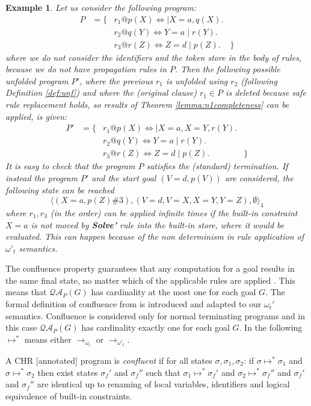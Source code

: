\documentclass[final]{acmtrans2e}
\newtheorem{exa}[theorem]{Example}
\newenvironment{example}{\begin{exa}}{\end{exa}}
\newcommand{\la}{\langle}
\newcommand{\ra}{\rangle}
\newcommand{\rrarrow}{\longrightarrow}
\begin{document}
\begin{example}
Let us consider the following program:
\[
\begin{array}{lcll}
P&=\{&r_1@p(X)\Leftrightarrow \mid X=a, q(X).&\\
&&r_2@q(Y)\Leftrightarrow Y=a \mid r(Y).&\\
&&r_3@r(Z)\Leftrightarrow Z=d \mid p(Z).&\}
\end{array}
\]
where we do not consider the identifiers and the token store in the
body of rules, because we do not have propagation rules in $P$.
Then the following possible unfolded program $P'$, where the previous
$r_1$ is unfolded using $r_2$ (following Definition \ref{def:unf}) and where the
(original clause) $r_1 \in P$ is deleted because safe rule replacement holds, so results of Theorem
\ref{lemma:n1completeness} can be applied, is given:
\[
\begin{array}{lcll}
P'&=\{&r_1@p(X)\Leftrightarrow \mid X=a, X=Y, r(Y).&\\
&&r_2@q(Y)\Leftrightarrow Y=a \mid r(Y).&\\
&&r_3@r(Z)\Leftrightarrow Z=d \mid p(Z).&\}
\end{array}
\]
It is easy to check that the program $P$ satisfies the (standard) termination.
If instead the program $P'$ and the start goal $(V=d,p(V))$ are
considered, the following state can be reached
$$\la  (X=a, p(Z)\#3),(V=d, V=X, X= Y, Y=Z), \emptyset \ra_4$$
where $r_1,r_3$ (in the order) can be applied infinite times if the built-in constraint $X=a$
is not moved by \textbf{Solve'} rule into the built-in store, where it would be
evaluated. This can happen because of the non determinism in rule application of
$\omega'_t$ semantics.
\end{example}

The confluence property guarantees that any computation for a goal
results in the same final state, no matter which of the applicable
rules are applied \cite{AF04}. This means that $\mathcal{QA}_P(G)$ has
cardinality  at the most one for each goal $G$.
The formal definition of confluence from \cite{Fru04}
is introduced and adapted to our $\omega_t'$ semantics.
Confluence is considered only for normal terminating programs and in this case $\mathcal{QA}_P(G)$ has
cardinality exactly one for each goal $G$.
In the following $\mapsto^{*}$ means either $\rrarrow_{\omega_t} $ or $\rrarrow_{\omega'_t}$.


\begin{definition}[Confluence]
A CHR [annotated] program is \emph{confluent} if for all states
$\sigma, \sigma_1, \sigma_2$:
if $\sigma\mapsto^{*} \sigma_1$ and $\sigma\mapsto^{*} \sigma_2$ then exist states $\sigma_f'$
and $\sigma_f''$ such that $\sigma_1 \mapsto^{*}\sigma_f'$ and $\sigma_2\mapsto^{*}\sigma_f''$ and
$\sigma_f'$ and $\sigma_f''$ are identical up to renaming of local variables,
identifiers and logical equivalence of built-in constraints.
\end{definition}
\end{document}
